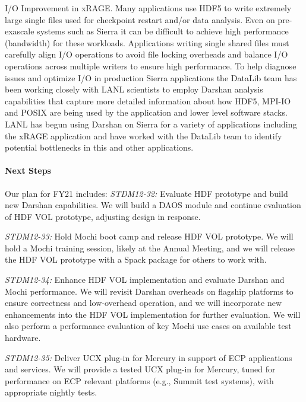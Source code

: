 I/O Improvement in xRAGE. Many applications use HDF5 to write extremely large
single files used for checkpoint restart and/or data analysis. Even on
pre-exascale systems such as Sierra it can be difficult to achieve high
performance (bandwidth) for these workloads. Applications writing single shared
files must carefully align I/O operations to avoid file locking overheads and
balance I/O operations across multiple writers to ensure high performance. To
help diagnose issues and optimize I/O in production Sierra applications the
DataLib team has been working closely with LANL scientists to employ Darshan
analysis capabilities that capture more detailed information about how HDF5,
MPI-IO and POSIX are being used by the application and lower level software
stacks. LANL has begun using Darshan on Sierra for a variety of applications
including the xRAGE application and have worked with the DataLib team to
identify potential bottlenecks in this and other applications.

\paragraph{Next Steps}

Our plan for FY21 includes:
\emph{STDM12-32:} Evaluate HDF prototype and build new Darshan capabilities. We
will build a DAOS module and continue evaluation of HDF VOL prototype,
adjusting design in response.

\emph{STDM12-33:} Hold Mochi boot camp and release HDF VOL prototype. We will
hold a Mochi training session, likely at the Annual Meeting, and we will
release the HDF VOL prototype with a Spack package for others to work with.

\emph{STDM12-34:} Enhance HDF VOL implementation and evaluate Darshan and Mochi
performance. We will revisit Darshan overheads on flagship platforms to ensure
correctness and low-overhead operation, and we will incorporate new
enhancements into the HDF VOL implementation for further evaluation. We will
also perform a performance evaluation of key Mochi use cases on available test
hardware.

\emph{STDM12-35:} Deliver UCX plug-in for Mercury in support of ECP
applications and services. We will provide a tested UCX plug-in for Mercury,
tuned for performance on ECP relevant platforms (e.g., Summit test systems),
with appropriate nightly tests.
